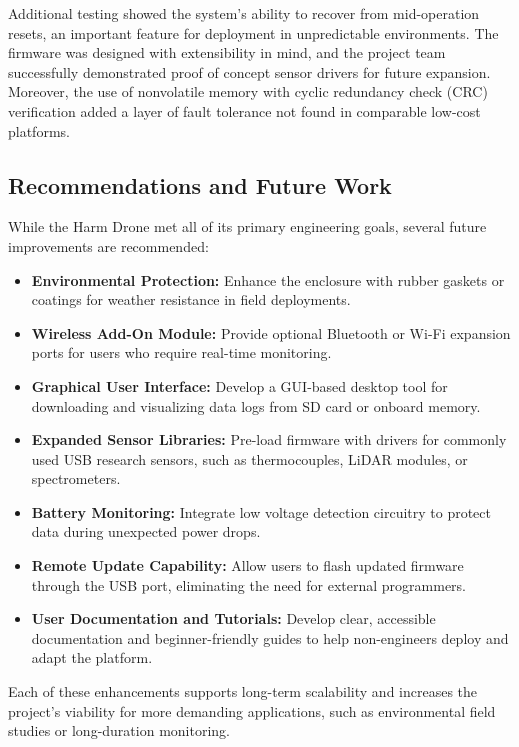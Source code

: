 \documentclass[12pt]{article}
\begin{document}
\par Additional testing showed the system’s ability to recover from mid-operation resets, an important feature for deployment in unpredictable environments. The firmware was designed with extensibility in mind, and the project team successfully demonstrated proof of concept sensor drivers for future expansion. Moreover, the use of nonvolatile memory with cyclic redundancy check (CRC) verification added a layer of fault tolerance not found in comparable low-cost platforms.

\subsection{Recommendations and Future Work}

While the Harm Drone met all of its primary engineering goals, several future improvements are recommended:

\begin{itemize}
\item \textbf{Environmental Protection:} Enhance the enclosure with rubber gaskets or coatings for weather resistance in field deployments.
\item \textbf{Wireless Add-On Module:} Provide optional Bluetooth or Wi-Fi expansion ports for users who require real-time monitoring.
\item \textbf{Graphical User Interface:} Develop a GUI-based desktop tool for downloading and visualizing data logs from SD card or onboard memory.
\item \textbf{Expanded Sensor Libraries:} Pre-load firmware with drivers for commonly used USB research sensors, such as thermocouples, LiDAR modules, or spectrometers.
\item \textbf{Battery Monitoring:} Integrate low voltage detection circuitry to protect data during unexpected power drops.
\item \textbf{Remote Update Capability:} Allow users to flash updated firmware through the USB port, eliminating the need for external programmers.
\item \textbf{User Documentation and Tutorials:} Develop clear, accessible documentation and beginner-friendly guides to help non-engineers deploy and adapt the platform.
\end{itemize}

\par Each of these enhancements supports long-term scalability and increases the project’s viability for more demanding applications, such as environmental field studies or long-duration monitoring.
\end{document}
